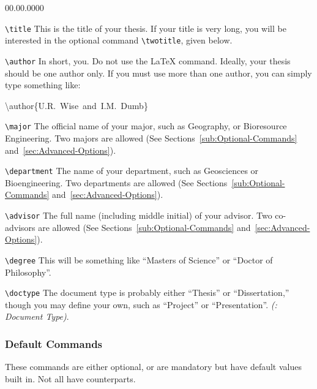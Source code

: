 \begin{lyxlist}{00.00.0000}
\item [\texttt{\textbackslash{}title}]This is the title of your thesis.
If your title is very long, you will be interested in the optional
command \texttt{\textbackslash{}twotitle}, given below. 
\item [\texttt{\textbackslash{}author}]In short, you. Do not use the \LaTeX{}
\texttt{\textbf{}} command. Ideally, your
thesis should be one author only. If you must use more than one author,
you can simply type something like:

\begin{lyxcode}
\textbackslash{}author\{U.R.~Wise~and~I.M.~Dumb\}
\end{lyxcode}
\item [\texttt{\textbackslash{}major}]The official name of your major,
such as Geography, or Bioresource Engineering. Two majors are allowed
(See Sections~\ref{sub:Optional-Commands} and~\ref{sec:Advanced-Options}).
\item [\texttt{\textbackslash{}department}]The name of your department,
such as Geosciences or Bioengineering. Two departments are allowed
(See Sections~\ref{sub:Optional-Commands} and~\ref{sec:Advanced-Options}).
\item [\texttt{\textbackslash{}advisor}]The full name (including middle
initial) of your advisor. Two co-advisors are allowed (See Sections~\ref{sub:Optional-Commands}
and~\ref{sec:Advanced-Options}).
\item [\texttt{\textbackslash{}degree}]This will be something like {}``Masters
of Science'' or {}``Doctor of Philosophy''.
\item [\texttt{\textbackslash{}doctype}]The document type is probably either
{}``Thesis'' or {}``Dissertation,'' though you may define your
own, such as {}``Project'' or {}``Presentation''. \emph{(\LyX{}:
Document Type)}.
\end{lyxlist}

\subsubsection{Default Commands}

These commands are either optional, or are mandatory but have default
values built in. Not all have \LyX{} counterparts.

